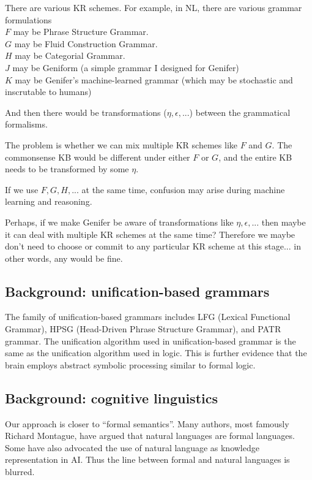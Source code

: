 There are various KR schemes.  For example, in NL, there are various grammar formulations\\
$F$ may be Phrase Structure Grammar.\\
$G$ may be Fluid Construction Grammar.\\
$H$ may be Categorial Grammar.\\
$J$ may be Geniform (a simple grammar I designed for Genifer)\\
$K$ may be Genifer's machine-learned grammar (which may be stochastic and inscrutable to humans)

And then there would be transformations ($\eta, \epsilon, ...$) between the grammatical formalisms.

The problem is whether we can mix multiple KR schemes like $F$ and $G$.  The commonsense KB would be different under either $F$ or $G$, and the entire KB needs to be transformed by some $\eta$.

If we use $F, G, H,...$ at the same time, confusion may arise during machine learning and reasoning.

Perhaps, if we make Genifer be aware of transformations like $\eta, \epsilon, ...$ then maybe it can deal with multiple KR schemes at the same time?  Therefore we maybe don't need to choose or commit to any particular KR scheme at this stage...  in other words, any would be fine.

\subsection{Background: unification-based grammars}

The family of unification-based grammars includes LFG (Lexical Functional Grammar), HPSG (Head-Driven Phrase Structure Grammar), and PATR grammar.  The unification algorithm used in unification-based grammar is the same as the unification algorithm used in logic.  This is further evidence that the brain employs abstract symbolic processing similar to formal logic.

\subsection{Background: cognitive linguistics}

Our approach is closer to ``formal semantics''.  Many authors, most famously Richard Montague, have argued that natural languages are formal languages.  Some have also advocated the use of natural language as knowledge representation in AI.  Thus the line between formal and natural languages is blurred.

